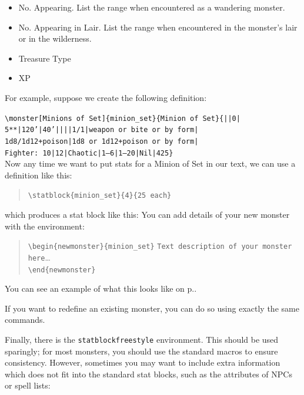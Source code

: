 \documentclass[letterpaper,serif]{rpg-module}
\begin{document}
\begin{itemize}
\item No. Appearing. List the range when encountered as a wandering monster.
\item No. Appearing in Lair. List the range when encountered in the monster's lair or in the wilderness.
\item Treasure Type
\item XP
\end{itemize}

\noindent For example, suppose we create the following definition:\\[0.1em]


\noindent\texttt{\textbackslash monster[Minions~of~Set]\{minion\_set\}\{Minion~of~Set\}\{||0|
5**|120'|40'||||1/1|weapon~or~bite~or~by~form|
1d8/1d12+poison|1d8~or~1d12+poison~or~by~form|
Fighter:~10|12|Chaotic|1--6|1--20|Nil|425\}}\\[0.1em]

\noindent Now any time we want to put stats for a Minion of Set in our text, we can use a definition like this:
\begin{quote}
\verb|\statblock{minion_set}{4}{25 each}|
\end{quote}
which produces a stat block like this:
You can add details of your new monster with the environment:
\begin{quote}
\verb|\begin{newmonster}{minion_set}|
\verb|Text description of your monster here|\ldots\\
\verb|\end{newmonster}|
\end{quote}
You can see an example of what this looks like on p.\pageref{minion_set}.

If you want to redefine an existing monster, you can do so using exactly the same commands.

Finally, there is the \verb|statblockfreestyle| environment. This should be used sparingly; for most monsters, you should use
the standard macros to ensure consistency. However, sometimes you may want to include extra information which does not
fit into the standard stat blocks, such as the attributes of NPCs or spell lists:

\end{document}
